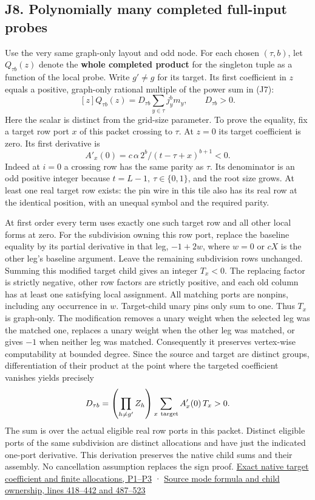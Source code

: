 \documentclass[11pt,a4paper]{article}
\begin{document}
\subsection{J8. Polynomially many completed full-input
probes}\label{v9-j8-polynomially-many-completed-full-input-probes}

Use the very same graph-only layout and odd node. For each chosen
\((\tau,b)\), let \(Q_{\tau b}(z)\) denote the \textbf{whole completed
product} for the singleton tuple as a function of the local probe. Write
\(g'\ne g\) for its target. Its first coefficient in \(z\) equals a
positive, graph-only rational multiple of the power sum in (J7): \[
             [z]Q_{\tau b}(z)=D_{\tau b}\sum_{y\in\tau} j_y^b m_y,
             \qquad D_{\tau b}>0 .                                     \tag{J8}
\] Here the scalar is distinct from the grid-size parameter. To prove
the equality, fix a target row port \(x\) of this packet crossing to
\(\tau\). At \(z=0\) its target coefficient is zero. Its first
derivative is \[
          A'_x(0)=c\,\alpha\, 2^b/(t-\tau+x)^{b+1}<0.
\] Indeed at \(i=0\) a crossing row has the same parity as \(\tau\). Its
denominator is an odd positive integer because
\(t=L-1,\ \tau\in\{0,1\}\), and the root size grows. At least one real
target row exists: the pin wire in this tile also has its real row at
the identical position, with an unequal symbol and the required parity.

At first order every term uses exactly one such target row and all other
local forms at zero. For the subdivision owning this row port, replace
the baseline equality by its partial derivative in that leg, \(-1+2w\),
where \(w=0\) or \(c X\) is the other leg's baseline argument. Leave the
remaining subdivision rows unchanged. Summing this modified target child
gives an integer \(T_x<0\). The replacing factor is strictly negative,
other row factors are strictly positive, and each old column has at
least one satisfying local assignment. All matching ports are nonpins,
including any occurrence in \(w\). Target-child unary pins only sum to
one. Thus \(T_x\) is graph-only. The modification removes a unary weight
when the selected leg was the matched one, replaces a unary weight when
the other leg was matched, or gives \(-1\) when neither leg was matched.
Consequently it preserves vertex-wise computability at bounded degree.
Since the source and target are distinct groups, differentiation of
their product at the point where the targeted coefficient vanishes
yields precisely \[
                D_{\tau b}=
                   \left(\prod_{h\ne g'} Z_h\right)
                   \sum_{x\ {\rm target}} A'_x(0)\,T_x>0 .
\] The sum is over the actual eligible real row ports in this packet.
Distinct eligible ports of the same subdivision are distinct allocations
and have just the indicated one-port derivative. This derivation
preserves the native child sums and their assembly. No cancellation
assumption replaces the sign proof.
\hyperref[v9-section-precision-frontier]{Exact native target coefficient
and finite allocations, P1--P3} ·
\href{https://github.com/openai/math/blob/main/preprints/The-Exponential-Time-Hypothesis-is-False-October-25-2026/build/quantitative-contraction.tex\#L418}{Source
mode formula and child ownership, lines 418--442 and 487--523}
\end{document}
